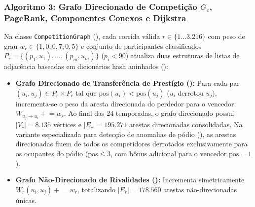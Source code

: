 \documentclass[conference]{IEEEtran}
\begin{document}
\subsubsection{Algoritmo 3: Grafo Direcionado de Competição $G_c$, PageRank, Componentes Conexos e Dijkstra}
Na classe \texttt{CompetitionGraph} (), cada corrida válida $r \in \{1 \dots 3.216\}$ com peso de grau $w_r \in \{1,0; 0,7; 0,5\}$ e conjunto de participantes classificados $P_r = \{(p_1, u_1), \dots, (p_m, u_m)\}$ ($p_i < 90$) atualiza duas estruturas de listas de adjacência baseadas em dicionários hash aninhados ():
\begin{itemize}
    \item \textbf{Grafo Direcionado de Transferência de Prestígio ():} Para cada par $(u_i, u_j) \in P_r \times P_r$ tal que $\text{pos}(u_i) < \text{pos}(u_j)$ ($u_i$ derrotou $u_j$), incrementa-se o peso da aresta direcionada do perdedor para o vencedor: $W_{u_j \to u_i} \mathrel{+}= w_r$. Ao final das 24 temporadas, o grafo direcionado possui $|V_c| = 8.135$ vértices e $|E_c| = 195.271$ arestas direcionadas consolidadas. Na variante especializada para detecção de anomalias de pódio (), as arestas direcionadas fluem de todos os competidores derrotados exclusivamente para os ocupantes do pódio ($\text{pos} \le 3$, com bônus adicional para o vencedor $\text{pos} = 1$).
    \item \textbf{Grafo Não-Direcionado de Rivalidades ():} Incrementa simetricamente $W_r(u_i, u_j) \mathrel{+}= w_r$, totalizando $|E_r| = 178.560$ arestas não-direcionadas únicas.
\end{itemize}
\end{document}

